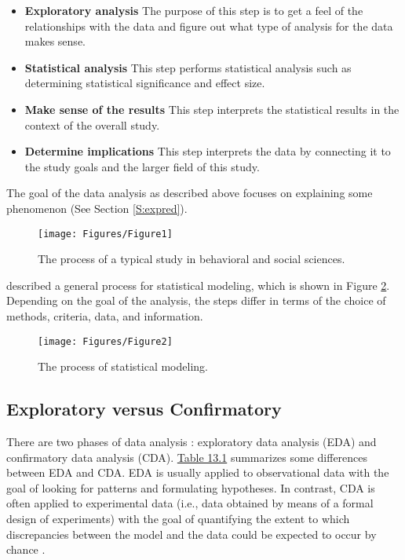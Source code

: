 \documentclass[]{book}
\theoremstyle{definition}
\theoremstyle{definition}
\theoremstyle{definition}
\theoremstyle{remark}
\begin{document}
\begin{itemize}
\item
  \textbf{Exploratory analysis} The purpose of this step is to get a
  feel of the relationships with the data and figure out what type of
  analysis for the data makes sense.
\item
  \textbf{Statistical analysis} This step performs statistical analysis
  such as determining statistical significance and effect size.
\item
  \textbf{Make sense of the results} This step interprets the
  statistical results in the context of the overall study.
\item
  \textbf{Determine implications} This step interprets the data by
  connecting it to the study goals and the larger field of this study.
\end{itemize}

The goal of the data analysis as described above focuses on explaining
some phenomenon (See Section \ref{S:expred}).

\begin{figure}

{\centering \texttt{[image: Figures/Figure1]} 

}

\caption{The process of a typical study in behavioral and social sciences.}\label{fig:study}
\end{figure}

\citet{shmueli2010model} described a general process for statistical
modeling, which is shown in Figure \ref{fig:modeling}. Depending on the
goal of the analysis, the steps differ in terms of the choice of
methods, criteria, data, and information.

\begin{figure}

{\centering \texttt{[image: Figures/Figure2]} 

}

\caption{The process of statistical modeling.}\label{fig:modeling}
\end{figure}

\subsection{Exploratory versus
Confirmatory}\label{exploratory-versus-confirmatory}

There are two phases of data analysis \citep{good1983data}: exploratory
data analysis (EDA) and confirmatory data analysis (CDA).
\protect\hyperlink{tab:13.1}{Table 13.1} summarizes some differences
between EDA and CDA. EDA is usually applied to observational data with
the goal of looking for patterns and formulating hypotheses. In
contrast, CDA is often applied to experimental data (i.e., data obtained
by means of a formal design of experiments) with the goal of quantifying
the extent to which discrepancies between the model and the data could
be expected to occur by chance \citep{gelman2004eda}.
\end{document}
